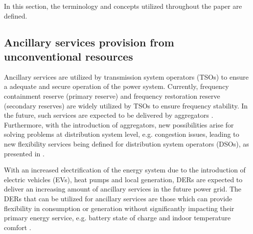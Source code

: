 In this section, the terminology and concepts utilized throughout the paper are defined. %

\subsection{Ancillary services provision from unconventional resources}\label{subsec:ASDER}
Ancillary services are utilized by transmission system operators (TSOs) to ensure a adequate and secure operation of the power system. 
Currently, frequency containment reserve (primary reserve) and frequency restoration reserve (secondary reserves) \cite{entso1operational} are widely utilized by TSOs to ensure frequency stability. In the future, such services are expected to be delivered by aggregators \cite{pudjianto2007virtual,vrettos2015frequency}. Furthermore, with the introduction of aggregators, new possibilities arise for solving problems at distribution system level, e.g. congestion issues, leading to new flexibility services being defined for distribution system operators (DSOs), as presented in \cite{ding2013development}. %

With an increased electrification of the energy system due to the introduction of electric vehicles (EVs), heat pumps and local generation, DERs are expected to deliver an increasing amount of ancillary services in the future power grid. The DERs that can be utilized for ancillary services are those which can provide flexibility in consumption or generation without significantly impacting their primary energy service, e.g. battery state of charge and indoor temperature comfort \cite{costanzo2013coordination,halvgaard2012economic}.

